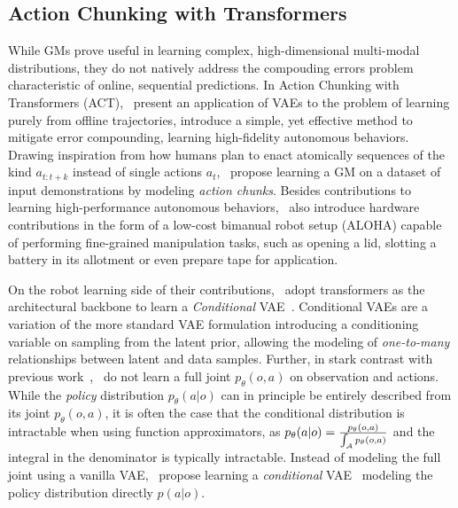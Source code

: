 \subsection{Action Chunking with Transformers}
While GMs prove useful in learning complex, high-dimensional multi-modal distributions, they do not natively address the compouding errors problem characteristic of online, sequential predictions.
In Action Chunking with Transformers (ACT),~\citet{zhaoLearningFineGrainedBimanual2023} present an application of VAEs to the problem of learning purely from offline trajectories, introduce a simple, yet effective method to mitigate error compounding, learning high-fidelity autonomous behaviors.
Drawing inspiration from how humans plan to enact atomically sequences of the kind \( a_{t:t+k} \) instead of single actions \( a_t \),~\citet{zhaoLearningFineGrainedBimanual2023} propose learning a GM on a dataset of input demonstrations by modeling \emph{action chunks}.
Besides contributions to learning high-performance autonomous behaviors,~\citet{zhaoLearningFineGrainedBimanual2023} also introduce hardware contributions in the form of a low-cost bimanual robot setup (ALOHA) capable of performing fine-grained manipulation tasks, such as opening a lid, slotting a battery in its allotment or even prepare tape for application.

On the robot learning side of their contributions,~\citet{zhaoLearningFineGrainedBimanual2023} adopt transformers as the architectural backbone to learn a \emph{Conditional} VAE~\citep{sohnLearningStructuredOutput2015}. 
Conditional VAEs are a variation of the more standard VAE formulation introducing a conditioning variable on sampling from the latent prior, allowing the modeling of \emph{one-to-many} relationships between latent and data samples.
Further, in stark contrast with previous work~\citep{florenceImplicitBehavioralCloning2022,jannerPlanningDiffusionFlexible2022},~\citet{zhaoLearningFineGrainedBimanual2023} do not learn a full joint \( p_\theta(o,a) \) on observation and actions.
While the \emph{policy} distribution \( p_\theta(a \vert o) \) can in principle be entirely described from its joint \( p_\theta(o,a) \), it is often the case that the conditional distribution is intractable when using function approximators, as \( p_\theta(a \vert o) = \tfrac{p_\theta(o,a)}{\int_\mathcal A p_\theta(o,a)} \) and the integral in the denominator is typically intractable.
Instead of modeling the full joint using a vanilla VAE,~\citet{zhaoLearningFineGrainedBimanual2023} propose learning a \emph{conditional} VAE~\citep{sohnLearningStructuredOutput2015} modeling the policy distribution directly \( p (a \vert o) \).

